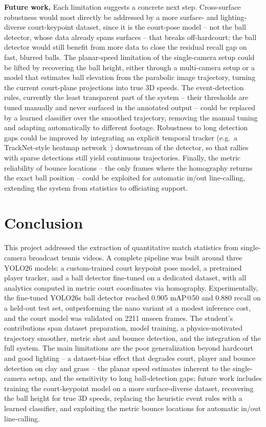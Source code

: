 \documentclass[10pt,twocolumn,a4paper]{article}
\begin{document}
	\textbf{Future work.} Each limitation suggests a concrete next step. Cross-surface robustness would most directly be addressed by a more surface- and lighting-diverse court-keypoint dataset, since it is the court-pose model -- not the ball detector, whose data already spans surfaces -- that breaks off-hardcourt; the ball detector would still benefit from more data to close the residual recall gap on fast, blurred balls. The planar-speed limitation of the single-camera setup could be lifted by recovering the ball height, either through a multi-camera setup or a model that estimates ball elevation from the parabolic image trajectory, turning the current court-plane projections into true 3D speeds. The event-detection rules, currently the least transparent part of the system -- their thresholds are tuned manually and never surfaced in the annotated output -- could be replaced by a learned classifier over the smoothed trajectory, removing the manual tuning and adapting automatically to different footage. Robustness to long detection gaps could be improved by integrating an explicit temporal tracker (e.g.\ a TrackNet-style heatmap network~\cite{huang2019tracknet}) downstream of the detector, so that rallies with sparse detections still yield continuous trajectories. Finally, the metric reliability of bounce locations -- the only frames where the homography returns the exact ball position -- could be exploited for automatic in/out line-calling, extending the system from statistics to officiating support.

	\section{Conclusion}

	This project addressed the extraction of quantitative match statistics from single-camera broadcast tennis videos. A complete pipeline was built around three YOLO26 models: a custom-trained court keypoint pose model, a pretrained player tracker, and a ball detector fine-tuned on a dedicated dataset, with all analytics computed in metric court coordinates via homography. Experimentally, the fine-tuned YOLO26s ball detector reached 0.905 mAP@50 and 0.880 recall on a held-out test set, outperforming the nano variant at a modest inference cost, and the court model was validated on 2211 unseen frames. The student's contributions span dataset preparation, model training, a physics-motivated trajectory smoother, metric shot and bounce detection, and the integration of the full system. The main limitations are the poor generalization beyond hardcourt and good lighting -- a dataset-bias effect that degrades court, player and bounce detection on clay and grass -- the planar speed estimates inherent to the single-camera setup, and the sensitivity to long ball-detection gaps; future work includes training the court-keypoint model on a more surface-diverse dataset, recovering the ball height for true 3D speeds, replacing the heuristic event rules with a learned classifier, and exploiting the metric bounce locations for automatic in/out line-calling.

	
	
\end{document}
